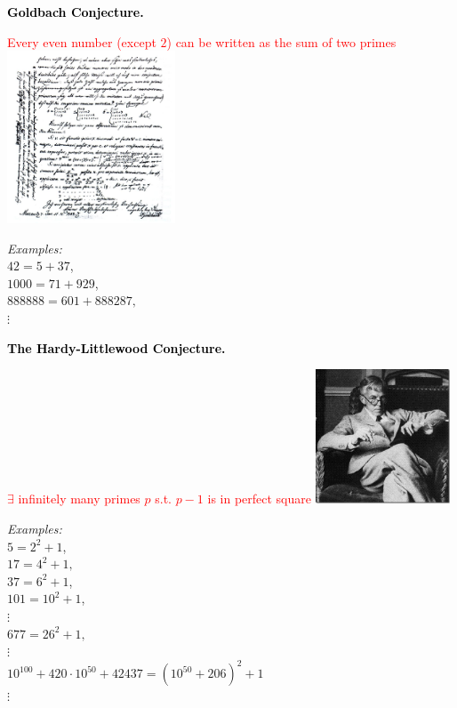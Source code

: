 \documentclass[landscape,display]{powersem} %
\newcommand{\heading}[1]{%
 \begin{center}
  \large\bf
  \shadowbox{{\textcolor{conceptcolor}{#1}}}%
 \end{center}
 \vspace{1ex minus 1ex}}
\begin{document}
\begin{slide}
\heading{Some conjectures about prime numbers: 2/5 }\pause

\textcolor{black}{\textbf{Goldbach Conjecture.}} 

\textcolor{red}{Every even number (except $2$) can be written as the sum of two primes}\pause
 \includegraphics[width=5cm]{images/Letter_Goldbaxh-Euler.jpg}\pause
\vspace{-5cm}\hspace*{7cm}
\begin{minipage}{4cm}
\textit{Examples:} \\
 $42=5+37$,\\ $1000=71+929$,\\ 
$888888=601+888287,$\\ $\vdots$\end{minipage}
\vfill
\end{slide}

\begin{slide}
\heading{Some conjectures about prime numbers: 3/5 }\pause

\textcolor{black}{\textbf{The Hardy-Littlewood Conjecture.}} \pause

\textcolor{red}{$\exists$ infinitely many primes  $p$ s.t. $p-1$ is in perfect square}\pause
 \includegraphics[width=4cm]{images/hardy.jpg}\pause

\vspace{-3.5cm}
\hspace*{5cm}
\begin{minipage}{7cm}
\textit{Examples:} \\
$5=2^2+1$,\\ $17=4^2+1,$\\ $37=6^2+1$,\\ $101=10^2+1$,\\ $\vdots$\\ $677=26^2+1,$\\ $\vdots$\\
$10^{100}+420\cdot10^{50}+42437=(10^{50}+206)^2+1$\\$\vdots$\end{minipage}
\end{slide}
\end{document}
